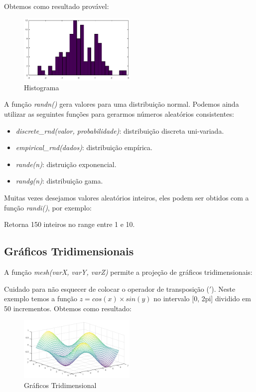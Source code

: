 \documentclass[a4paper,11pt]{article}
\begin{document}
Obtemos como resultado provável:
\begin{figure}[H]
	\centering
	\includegraphics[width=0.5\textwidth]{imagem/histograma}
	\caption{Histograma}
\end{figure}

A função \textit{randn()} gera valores para uma distribuição normal. Podemos ainda utilizar as seguintes funções para gerarmos números aleatórios consistentes:
\begin{itemize}[nolistsep]
	\item \textit{discrete\_rnd(valor, probabilidade)}: distribuição discreta uni-variada.
	\item \textit{empirical\_rnd(dados)}: distribuição empírica.
	\item \textit{rande(n)}: distruição exponencial.
	\item \textit{randg(n)}: distribuição gama.
\end{itemize}	
	
Muitas vezes desejamos valores aleatórios inteiros, eles podem ser obtidos com a função \textit{randi()}, por exemplo: \\

Retorna 150 inteiros no range entre 1 e 10.

\subsection{Gráficos Tridimensionais}
A função \textit{mesh(varX, varY, varZ)} permite a projeção de gráficos tridimensionais: \\

Cuidado para não esquecer de colocar o operador de transposição ($'$). Neste exemplo temos a função $z = cos(x) \times sin(y)$ no intervalo [0, 2pi] dividido em 50 incrementos. Obtemos como resultado:
\begin{figure}[H]
	\centering
	\includegraphics[width=0.5\textwidth]{imagem/graficoTri}
	\caption{Gráficos Tridimensional}
\end{figure}
\end{document}
